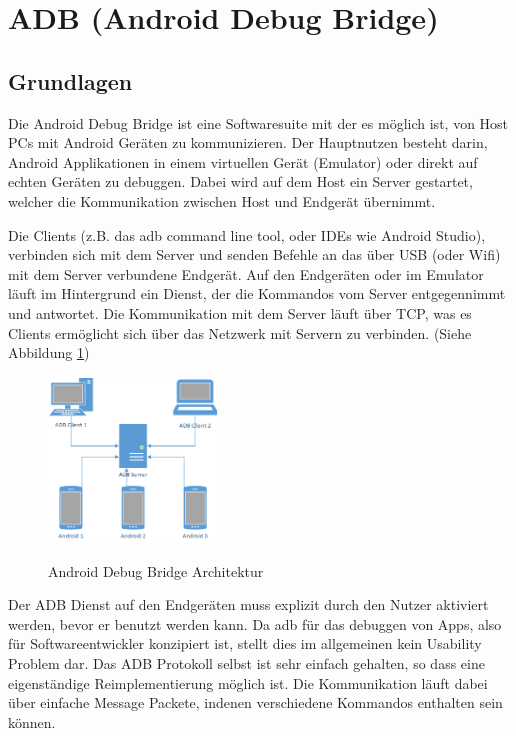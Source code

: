 \documentclass[12pt,journal,compsoc]{IEEEtran}
\begin{document}
\section{ADB (Android Debug Bridge)}
\subsection{Grundlagen}
Die Android Debug Bridge ist eine Softwaresuite mit der es möglich ist, von Host PCs mit Android Geräten zu kommunizieren.
Der Hauptnutzen besteht darin, Android Applikationen in einem virtuellen Gerät (Emulator) oder direkt auf echten Geräten zu debuggen.
Dabei wird auf dem Host ein Server gestartet, welcher die Kommunikation zwischen Host und Endgerät übernimmt. 

Die Clients (z.B. das adb command line tool, oder IDEs wie Android Studio), verbinden sich mit dem Server und senden Befehle an das über USB (oder Wifi) mit dem Server verbundene Endgerät.
Auf den Endgeräten oder im Emulator läuft im Hintergrund ein Dienst, der die Kommandos vom Server entgegennimmt und antwortet. Die Kommunikation mit dem Server läuft über TCP,
was es Clients ermöglicht sich über das Netzwerk mit Servern zu verbinden. (Siehe Abbildung \ref{adb})
\begin{figure}
	\centering
	\caption{Android Debug Bridge Architektur}
	\includegraphics[width=0.4\textwidth]{media/adb.png}	
	\label{adb}
\end{figure}

Der ADB Dienst auf den Endgeräten muss explizit durch den Nutzer aktiviert werden, bevor er benutzt werden kann.
Da adb für das debuggen von Apps, also für Softwareentwickler konzipiert ist, stellt dies im allgemeinen kein Usability Problem dar. 
Das ADB Protokoll selbst ist sehr einfach gehalten, so dass eine eigenständige Reimplementierung möglich ist.
Die Kommunikation läuft dabei über einfache Message Packete, indenen verschiedene Kommandos enthalten sein können.
\lstset{language=C,
	basicstyle=\ttfamily\scriptsize
}

  
\end{document}
